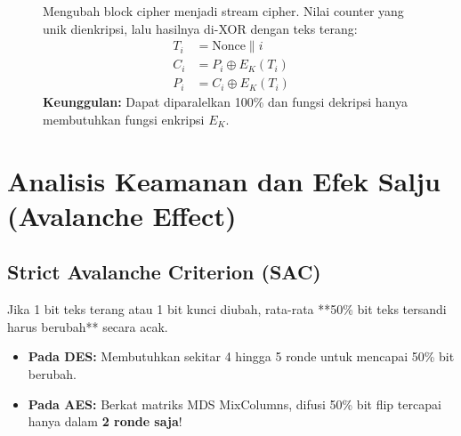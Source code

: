 \documentclass[11pt,a4paper]{article}
\begin{document}
\begin{figure}[H]
\centering
\begin{tcolorbox}[title=3. Counter Mode (CTR)]
Mengubah block cipher menjadi stream cipher. Nilai counter yang unik dienkripsi, lalu hasilnya di-XOR dengan teks terang:
\begin{align}
T_i &= \text{Nonce} \parallel i \\
C_i &= P_i \oplus E_K(T_i) \\
P_i &= C_i \oplus E_K(T_i)
\end{align}
\textbf{Keunggulan:} Dapat diparalelkan 100\% dan fungsi dekripsi hanya membutuhkan fungsi enkripsi $E_K$.
\end{tcolorbox}
\end{figure}

\newpage
\section{Analisis Keamanan dan Efek Salju (Avalanche Effect)}

\subsection{Strict Avalanche Criterion (SAC)}
Jika 1 bit teks terang atau 1 bit kunci diubah, rata-rata **50\% bit teks tersandi harus berubah** secara acak.
\begin{itemize}[leftmargin=*]
    \item \textbf{Pada DES:} Membutuhkan sekitar 4 hingga 5 ronde untuk mencapai 50\% bit berubah.
    \item \textbf{Pada AES:} Berkat matriks MDS MixColumns, difusi 50\% bit flip tercapai hanya dalam \textbf{2 ronde saja}!
\end{itemize}
\end{document}
